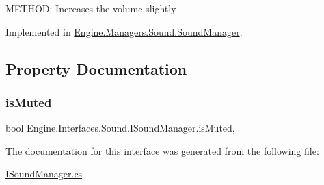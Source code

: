 M\+E\+T\+H\+OD\+: Increases the volume slightly 



Implemented in \hyperlink{a00546_af9d82c533dfd90077b275f2b09ee90b0}{Engine.\+Managers.\+Sound.\+Sound\+Manager}.



\subsection{Property Documentation}
\mbox{\label{a00482_ac8a262a7db42a3802a58c9a7e0a471ca}} 
\subsubsection{\texorpdfstring{is\+Muted}{isMuted}}
{\footnotesize\ttfamily bool Engine.\+Interfaces.\+Sound.\+I\+Sound\+Manager.\+is\+Muted\hspace{0.3cm}{\ttfamily [get]}, {\ttfamily [set]}}



The documentation for this interface was generated from the following file\+:\begin{DoxyCompactItemize}
\item 
\hyperlink{a00143}{I\+Sound\+Manager.\+cs}\end{DoxyCompactItemize}

